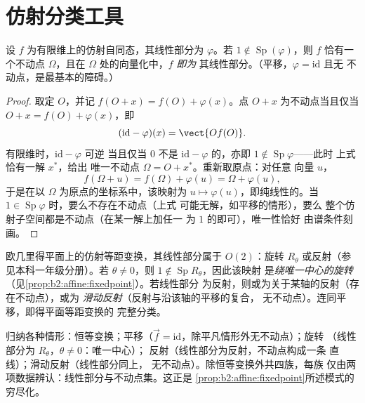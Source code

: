 \section{仿射分类工具}

\begin{proposition}[仿射映射的不动点]\label{prop:b2:affine:fixedpoint}
设 $f$ 为有限维上的仿射自同态，其线性部分为 $\varphi$。若 $1 \notin
\operatorname{Sp}(\varphi)$，则 $f$ 恰有一个不动点
$\Omega$，且在 $\Omega$ 处的向量化中，$f$ \emph{即为}
其线性部分。（平移，$\varphi = \mathrm{id}$ 且无
不动点，是最基本的障碍。）
\end{proposition}

\begin{proof}
取定 $O$，并记 $f(O + x) = f(O) + \varphi(x)$。点
$O + x$ 为不动点当且仅当 $O + x = f(O) + \varphi(x)$，即
\[
(\mathrm{id} - \varphi)(x) = \vect{O f(O)} .
\]
有限维时，$\mathrm{id} - \varphi$ 可逆
当且仅当 $0$ 不是 $\mathrm{id} - \varphi$ 的，亦即
$1 \notin \operatorname{Sp}\varphi$——此时
上式恰有一解 $x^*$，给出
唯一不动点 $\Omega = O + x^*$。重新取原点：对任意
向量 $u$，
\[
f(\Omega + u) = f(\Omega) + \varphi(u) = \Omega + \varphi(u),
\]
于是在以 $\Omega$ 为原点的坐标系中，该映射为 $u \mapsto
\varphi(u)$，即纯线性的。当 $1 \in
\operatorname{Sp}\varphi$ 时，要么不存在不动点（上式
可能无解，如平移的情形），要么
整个仿射子空间都是不动点（在某一解上加任一
为 $1$ 的即可），唯一性恰好
由谱条件刻画。
\end{proof}

\begin{example}[平面等距变换的完整分类]\label{ex:b2:affine:isometries}
欧几里得平面上的仿射等距变换，其线性部分属于
$O(2)$：旋转 $R_\theta$ 或反射（参见本科一年级分册）。若
$\theta \neq 0$，则 $1 \notin \operatorname{Sp} R_\theta$，因此该映射
是\emph{绕唯一中心的旋转}
（见\cref{prop:b2:affine:fixedpoint}）。若线性部分
为反射，则或为关于某轴的反射（存在不动点），或为
\emph{滑动反射}（反射与沿该轴的平移的复合，
无不动点）。连同平移，即得平面等距变换的
完整分类。
\end{example}

\begin{remark}[平面等距变换一览]
归纳各种情形：恒等变换；平移（$\vec f =
\mathrm{id}$，除平凡情形外无不动点）；旋转
（线性部分为 $R_\theta$，$\theta \neq 0$：唯一中心）；
反射（线性部分为反射，不动点构成一条
直线）；滑动反射（线性部分同上，
无不动点）。除恒等变换外共四族，每族
仅由两项数据辨认：线性部分与不动点集。这正是
\cref{prop:b2:affine:fixedpoint}所述模式的
穷尽化。
\end{remark}

